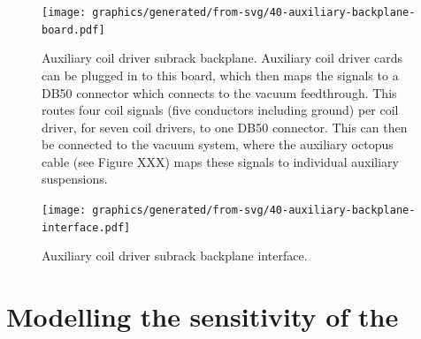 \begin{figure}
  \centering
  \texttt{[image: graphics/generated/from-svg/40-auxiliary-backplane-board.pdf]}
  \caption[Auxiliary subrack backplane board schematic]{\label{fig:aux-backplane-schematic}Auxiliary coil driver subrack backplane. Auxiliary coil driver cards can be plugged in to this board, which then maps the signals to a DB50 connector which connects to the vacuum feedthrough. This routes four coil signals (five conductors including ground) per coil driver, for seven coil drivers, to one DB50 connector. This can then be connected to the vacuum system, where the auxiliary octopus cable (see Figure XXX) maps these signals to individual auxiliary suspensions.}
\end{figure}

\begin{figure}
  \centering
  \texttt{[image: graphics/generated/from-svg/40-auxiliary-backplane-interface.pdf]}
  \caption[Auxiliary subrack backplane interface]{\label{fig:aux-backplane-interface}Auxiliary coil driver subrack backplane interface.}
\end{figure}

\section{Modelling the sensitivity of the \SSM{}}
